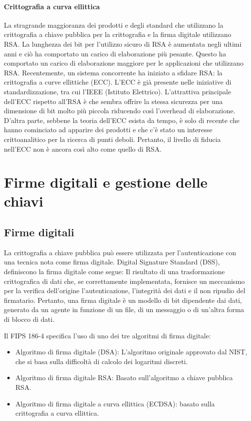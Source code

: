 \paragraph{Crittografia a curva ellittica} La stragrande maggioranza dei prodotti e degli standard che utilizzano la crittografia a chiave pubblica per la crittografia e la firma digitale utilizzano RSA. La lunghezza dei bit per l'utilizzo sicuro di RSA è aumentata negli ultimi anni e ciò ha comportato un carico di elaborazione più pesante.
Questo ha comportato un carico di elaborazione maggiore per le applicazioni che utilizzano RSA. Recentemente, un sistema concorrente ha iniziato a sfidare RSA: la crittografia a curve ellittiche (ECC). L'ECC è già presente nelle iniziative di standardizzazione, tra cui l'IEEE (Istituto Elettrico). L'attrattiva principale dell'ECC rispetto all'RSA è che sembra offrire la stessa sicurezza per una dimensione di bit molto più piccola riducendo così l'overhead di elaborazione. D'altra parte, sebbene la teoria dell'ECC esista da tempo, è solo di recente che hanno cominciato ad apparire dei prodotti e che c'è stato un interesse crittoanalitico per la ricerca di punti deboli. Pertanto, il livello di fiducia nell'ECC non è ancora così alto come quello di RSA.
\newpage
\section{Firme digitali e gestione delle chiavi}
\subsection{Firme digitali}
La crittografia a chiave pubblica può essere utilizzata per l'autenticazione con una tecnica nota come firma digitale. Digital Signature Standard (DSS), definiscono la firma digitale come segue: Il risultato di una trasformazione crittografica di dati che, se correttamente implementata, fornisce un meccanismo per la verifica dell'origine l'autenticazione, l'integrità dei dati e il non ripudio del firmatario. Pertanto, una firma digitale è un modello di bit dipendente dai dati, generato da un agente in funzione di un file, di un messaggio o di un'altra forma di blocco di dati. 

\singlespacing

Il FIPS 186-4 specifica l'uso di uno dei tre algoritmi di firma digitale:
\begin{itemize}
    \item Algoritmo di firma digitale (DSA): L'algoritmo originale approvato dal NIST, che si basa sulla difficoltà di calcolo dei logaritmi discreti.
    
    \item Algoritmo di firma digitale RSA: Basato sull'algoritmo a chiave pubblica RSA.
    
    \item Algoritmo di firma digitale a curva ellittica (ECDSA): basato sulla crittografia a curva ellittica.
\end{itemize}

